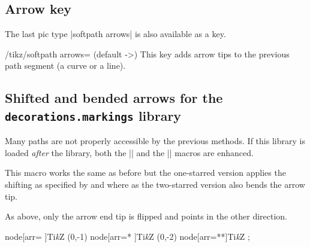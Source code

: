 \begin{multicols}{2}
\subsection{Arrow key}
The last pic type |softpath arrows| is also available as a key.
\begin{key}{/tikz/softpath arrows= (default ->)}
This key adds arrow tips to the previous path segment (a curve or a line).
\end{key}

\subsection{Shifted and bended arrows for the \texttt{decorations.markings} library}
Many paths are not properly accessible by the previous methods.
If this library is loaded \emph{after}
the  library,
both the |\arrow| and the |\arrowreversed| macros are enhanced.

\begin{command}{\arrow{}}
  This macro works the same as before but the one-starred version
  applies the shifting as specified
  by  and 
  where as the two-starred version also bends the arrow tip.
\end{command}
\begin{command}{\arrowreversed{}}
  As above, only the arrow end tip is flipped and points in the other direction.
\end{command}
\begin{codeexample}[width=2cm,preamble=\usetikzlibrary{bending, decorations.markings, ext.arrows-plus}]
\tikz[y=1.5cm, >=Stealth, arrows={[round]}, nodes={circle, draw}]
  \path   node[arr=  ]{Ti\emph kZ} %
   (0,-1) node[arr=* ]{Ti\emph kZ} %
   (0,-2) node[arr=**]{Ti\emph kZ} %
  ;
\end{codeexample}
\end{multicols}
\endinput
